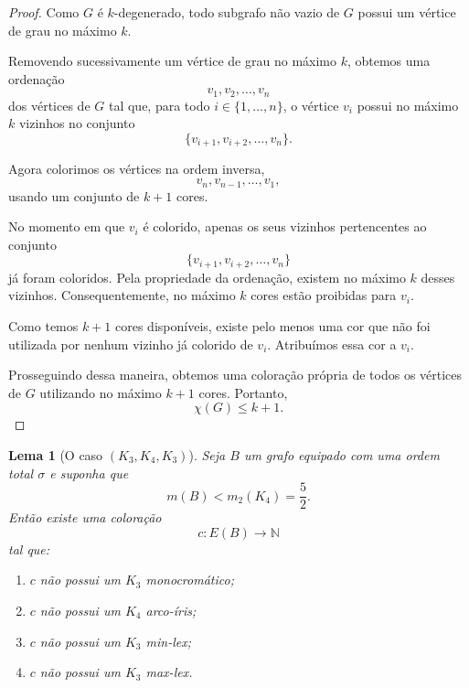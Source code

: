 \documentclass[reqno, 12pt]{amsart}
\numberwithin{equation}{section}
\theoremstyle{plain}
\newtheorem{lemma}[theorem]{Lema}
\theoremstyle{definition}
\begin{document}
\begin{proof}
  Como \(G\) é \(k\)-degenerado, todo subgrafo não vazio de \(G\) possui um vértice de grau no máximo \(k\).

  Removendo sucessivamente um vértice de grau no máximo \(k\), obtemos uma ordenação
  \[
    v_1,v_2,\ldots,v_n
  \]
  dos vértices de \(G\) tal que, para todo \(i\in\{1,\ldots,n\}\), o vértice \(v_i\) possui no máximo \(k\) vizinhos no conjunto
  \[
    \{v_{i+1},v_{i+2},\ldots,v_n\}.
  \]

  Agora colorimos os vértices na ordem inversa,
  \[
    v_n,v_{n-1},\ldots,v_1,
  \]
  usando um conjunto de \(k+1\) cores.

  No momento em que \(v_i\) é colorido, apenas os seus vizinhos pertencentes ao conjunto
  \[
    \{v_{i+1},v_{i+2},\ldots,v_n\}
  \]
  já foram coloridos. Pela propriedade da ordenação, existem no máximo \(k\) desses vizinhos. Consequentemente, no máximo \(k\) cores estão proibidas para \(v_i\).

  Como temos \(k+1\) cores disponíveis, existe pelo menos uma cor que não foi utilizada por nenhum vizinho já colorido de \(v_i\). Atribuímos essa cor a \(v_i\).

  Prosseguindo dessa maneira, obtemos uma coloração própria de todos os vértices de \(G\) utilizando no máximo \(k+1\) cores. Portanto,
  \[
    \chi(G)\leq k+1.
  \]
\end{proof}


\begin{lemma}[O caso $(K_3,K_4,K_3)$]
  \label{lem:343-density}
  Seja $B$ um grafo equipado com uma ordem total $\sigma$ e suponha que
  \[
    m(B)<m_2(K_4)=\frac52.
  \]
  Então existe uma coloração
  \[
    c:E(B)\longrightarrow\mathbb{N}
  \]
  tal que:
  \begin{enumerate}
    \item[(i)] $c$ não possui um $K_3$ monocromático;
    \item[(ii)] $c$ não possui um $K_4$ arco-íris;
    \item[(iii)] $c$ não possui um $K_3$ min-lex;
    \item[(iv)] $c$ não possui um $K_3$ max-lex.
  \end{enumerate}
\end{lemma}
\end{document}
